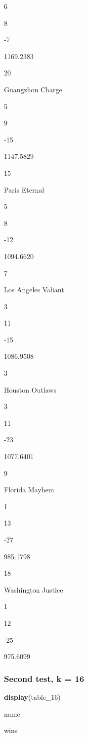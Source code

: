 \documentclass[]{article}
\newenvironment{Shaded}{\begin{snugshade}}{\end{snugshade}}
\newcommand{\KeywordTok}[1]{\textcolor[rgb]{0.13,0.29,0.53}{\textbf{#1}}}
\newcommand{\DecValTok}[1]{\textcolor[rgb]{0.00,0.00,0.81}{#1}}
\newcommand{\NormalTok}[1]{#1}
\begin{document}
6

8

{-7}

{1169.2383}

20

Guangzhou Charge

5

9

{-15}

{1147.5829}

15

Paris Eternal

5

8

{-12}

{1094.6620}

7

Los Angeles Valiant

3

11

{-15}

{1086.9508}

3

Houston Outlaws

3

11

{-23}

{1077.6401}

9

Florida Mayhem

1

13

{-27}

{985.1798}

18

Washington Justice

1

12

{-25}

{975.6099}

\subsubsection{Second test, k = 16}\label{second-test-k-16}

\begin{Shaded}
\begin{Highlighting}[]
\KeywordTok{display}\NormalTok{(table_}\DecValTok{16}\NormalTok{)}
\end{Highlighting}
\end{Shaded}

name

wins
\end{document}
